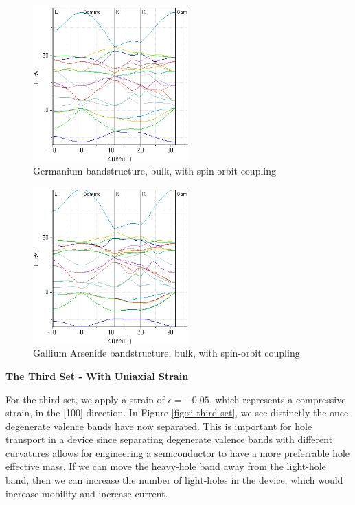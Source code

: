\documentclass{IEEEtran}
\begin{document}
\begin{figure}[!ht] 
    \centering
    \includegraphics*[width = 6cm]{ge-bands-secondset.png}
    \caption{Germanium bandstructure, bulk, with spin-orbit coupling}
    \label{fig:ge-second-set}
\end{figure}    

\begin{figure}[!ht] 
    \centering
    \includegraphics*[width = 6cm]{gaas-bands-secondset.png}
    \caption{Gallium Arsenide bandstructure, bulk, with spin-orbit coupling}
    \label{fig:gaas-second-set}
\end{figure}    

\bigskip

\textbf{The Third Set - With Uniaxial Strain}


For the third set, we apply a strain of \(\epsilon = -0.05\), which represents a compressive strain, in the [100] direction. In Figure \ref{fig:si-third-set}, we see distinctly the once degenerate valence bands have now separated. This is important for hole transport in a device since separating degenerate valence bands with different curvatures allows for engineering a semiconductor to have a more preferrable hole effective mass. If we can move the heavy-hole band away from the light-hole band, then we can increase the number of light-holes in the device, which would increase mobility and increase current.
\end{document}
